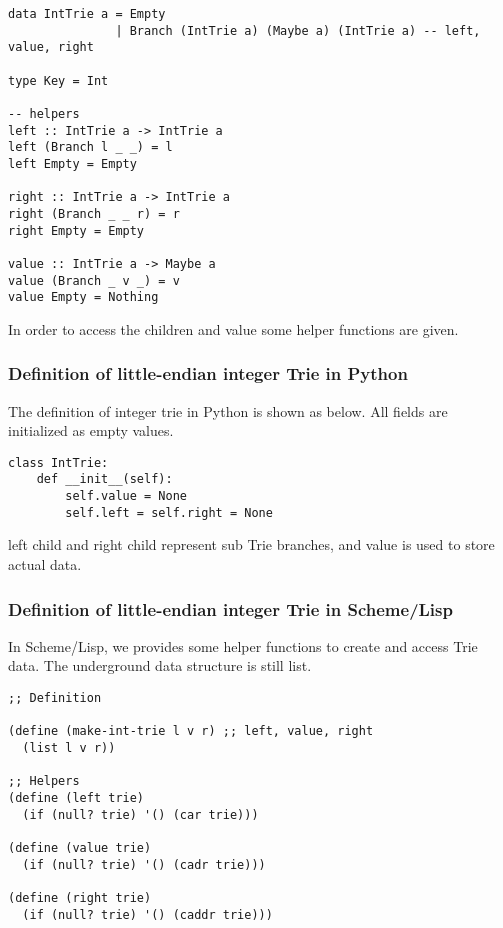 \documentclass{article}
\begin{document}
\lstset{language=Haskell}
\begin{lstlisting}
data IntTrie a = Empty 
               | Branch (IntTrie a) (Maybe a) (IntTrie a) -- left, value, right

type Key = Int

-- helpers
left :: IntTrie a -> IntTrie a
left (Branch l _ _) = l
left Empty = Empty

right :: IntTrie a -> IntTrie a
right (Branch _ _ r) = r
right Empty = Empty

value :: IntTrie a -> Maybe a
value (Branch _ v _) = v
value Empty = Nothing
\end{lstlisting}

In order to access the children and value some helper functions are given.

\subsubsection*{Definition of little-endian integer Trie in Python}
The definition of integer trie in Python is shown as below. All fields
are initialized as empty values.

\lstset{language=Python}
\begin{lstlisting}
class IntTrie:
    def __init__(self):
        self.value = None
        self.left = self.right = None
\end{lstlisting}

left child and right child represent sub Trie branches, and value is used to 
store actual data.

\subsubsection*{Definition of little-endian integer Trie in Scheme/Lisp}
In Scheme/Lisp, we provides some helper functions to create and access 
Trie data. The underground data structure is still list.

\lstset{language=lisp}
\begin{lstlisting}
;; Definition

(define (make-int-trie l v r) ;; left, value, right
  (list l v r))

;; Helpers
(define (left trie)
  (if (null? trie) '() (car trie)))

(define (value trie)
  (if (null? trie) '() (cadr trie)))

(define (right trie)
  (if (null? trie) '() (caddr trie)))
\end{lstlisting}
\end{document}

